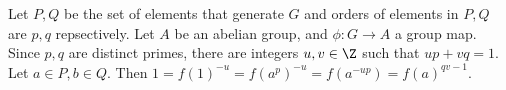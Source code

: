 \begin{sol}
Let $P,Q$ be the set of elements that generate $G$ and orders of elements in $P,Q$ are $p,q$ repsectively. Let $A$ be an abelian group, and $\phi:G\to A$ a group map. Since $p,q$ are distinct primes, there are integers $u,v\in \Z$ such that $up+vq = 1$. Let $a\in P,b\in Q$. Then $1 = f(1)^{-u} = f(a^p)^{-u} = f(a^{-up}) = f(a)^{qv-1}$. 
\end{sol}
